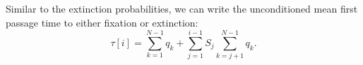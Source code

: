 Similar to the extinction probabilities, we can write the unconditioned mean first passage time to either fixation or extinction:
\begin{equation}
\tau[i] = \sum_{k=1}^{N-1}q_k + \sum_{j=1}^{i-1}S_{j}\sum_{k=j+1}^{N-1}q_k. 
\end{equation}
